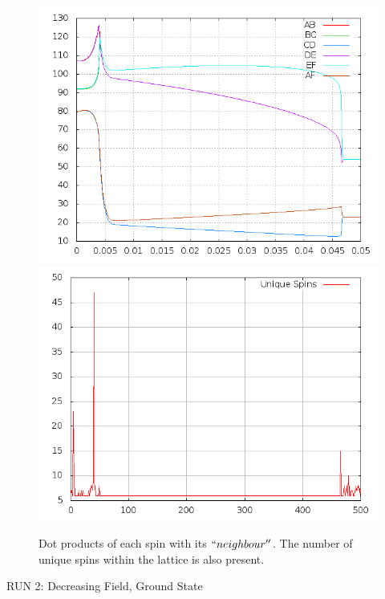 \documentclass{article}
\begin{document}
\begin{center}
\begin{figure}
\centering
\includegraphics[scale=0.5]{000to005dots.png}
\includegraphics[scale=0.5]{000to005Freq.png}
\caption{Dot products of each spin with its $``neighbour''$. The number of unique spins within the lattice is also present.}
\end{figure}
\end{center}
\pagebreak

\thispagestyle{plain}
\begin{center}
\LARGE
RUN 2: Decreasing Field, Ground State
\end{center}
\end{document}
